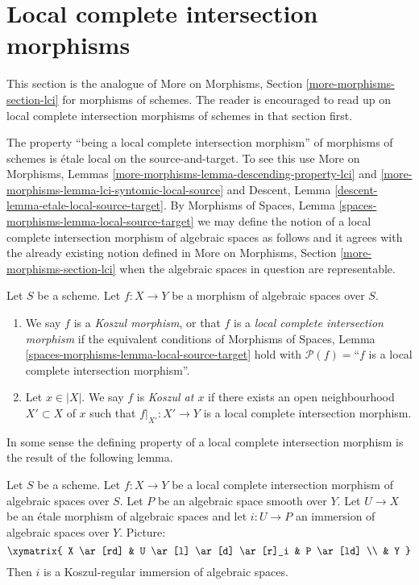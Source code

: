 \section{Local complete intersection morphisms}
\label{section-lci}

\noindent
This section is the analogue of
More on Morphisms, Section \ref{more-morphisms-section-lci}
for morphisms of schemes. The reader is encouraged to read up
on local complete intersection morphisms of schemes in that section first.

\medskip\noindent
The property ``being a local complete intersection morphism'' of morphisms
of schemes is \'etale local on the source-and-target. To see this use
More on Morphisms,
Lemmas \ref{more-morphisms-lemma-descending-property-lci} and
\ref{more-morphisms-lemma-lci-syntomic-local-source}
and
Descent, Lemma \ref{descent-lemma-etale-local-source-target}.
By
Morphisms of Spaces,
Lemma \ref{spaces-morphisms-lemma-local-source-target}
we may define the notion of a local complete intersection morphism
of algebraic spaces as follows and it agrees with the already existing
notion defined in
More on Morphisms, Section \ref{more-morphisms-section-lci}
when the algebraic spaces in question are representable.

\begin{definition}
\label{definition-lci}
Let $S$ be a scheme.
Let $f : X \to Y$ be a morphism of algebraic spaces over $S$.
\begin{enumerate}
\item We say $f$ is a {\it Koszul morphism}, or that $f$ is a
{\it local complete intersection morphism} if the equivalent conditions of
Morphisms of Spaces, Lemma \ref{spaces-morphisms-lemma-local-source-target}
hold with $\mathcal{P}(f) =$``$f$ is a local complete intersection morphism''.
\item Let $x \in |X|$. We say $f$ is {\it Koszul at $x$} if
there exists an open neighbourhood $X' \subset X$ of $x$ such
that $f|_{X'} : X' \to Y$ is a local complete intersection morphism.
\end{enumerate}
\end{definition}

\noindent
In some sense the defining property of a local complete intersection
morphism is the result of the following lemma.

\begin{lemma}
\label{lemma-lci}
Let $S$ be a scheme.
Let $f : X \to Y$ be a local complete intersection morphism
of algebraic spaces over $S$.
Let $P$ be an algebraic space smooth over $Y$.
Let $U \to X$ be an \'etale morphism of algebraic spaces
and let $i : U \to P$ an immersion of algebraic spaces over $Y$.
Picture:
$$
\xymatrix{
X \ar[rd] & U \ar[l] \ar[d] \ar[r]_i & P \ar[ld] \\
& Y
}
$$
Then $i$ is a Koszul-regular immersion of algebraic spaces.
\end{lemma}


